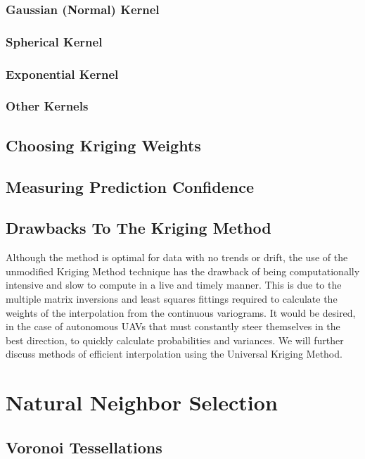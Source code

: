 \documentclass[11pt]{ucthesis}
\begin{document}
\subsubsection{Gaussian (Normal) Kernel}
\subsubsection{Spherical Kernel}
\subsubsection{Exponential Kernel}
\subsubsection{Other Kernels}

\subsection{Choosing Kriging Weights}

\subsection{Measuring Prediction Confidence}

\subsection{Drawbacks To The Kriging Method}
Although the method is optimal for data with no trends or drift, the use of the unmodified Kriging Method technique has the drawback of being computationally intensive and slow to compute in a live and timely manner. This is due to the multiple matrix inversions and least squares fittings required to calculate the weights of the interpolation from the continuous variograms. It would be desired, in the case of autonomous UAVs that must constantly steer themselves in the best direction, to quickly calculate probabilities and variances. We will further discuss methods of efficient interpolation using the Universal Kriging Method.


\section{Natural Neighbor Selection}
\subsection{Voronoi Tessellations}
\end{document}
